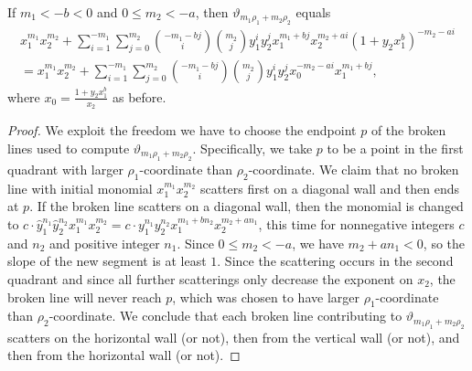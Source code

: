 \documentclass[ALCO,ThmDefs,Unicode,epreuves]{cedram}
\newcommand{\thet}{\vartheta}
\newcommand{\hy}{\hat{y}}
\begin{document}
\begin{prop}\label{theta m2 a}
If $m_1<-b<0$ and $0\le m_2<-a$, then $\thet_{m_1\rho_1+m_2\rho_2}$ equals
\begin{multline*}
x_1^{m_1}x_2^{m_2}+\sum_{i=1}^{-m_1}\sum_{j=0}^{m_2}\binom{-m_1-bj}i\binom{m_2}j y_1^iy_2^jx_1^{m_1+bj}x_2^{m_2+ai}(1+y_2x_1^b)^{-m_2-ai}\\
=x_1^{m_1}x_2^{m_2}+\sum_{i=1}^{-m_1}\sum_{j=0}^{m_2}\binom{-m_1-bj}i\binom{m_2}j y_1^iy_2^jx_0^{-m_2-ai}x_1^{m_1+bj},
\end{multline*}
where $x_0=\frac{1+y_2x_1^b}{x_2}$ as before.
\end{prop}
\begin{proof}
We exploit the freedom we have to choose the endpoint $p$ of the broken lines used to compute $\thet_{m_1\rho_1+m_2\rho_2}$.
Specifically, we take $p$ to be a point in the first quadrant with larger $\rho_1$-coordinate than $\rho_2$-coordinate.
We claim that no broken line with initial monomial $x_1^{m_1}x_2^{m_2}$ scatters first on a diagonal wall and then ends at $p$.
If the broken line scatters on a diagonal wall, then the monomial is changed to $c\cdot \hy_1^{n_1}\hy_2^{n_2}x_1^{m_1}x_2^{m_2}=c\cdot y_1^{n_1}y_2^{n_2}x_1^{m_1+bn_2}x_2^{m_2+an_1}$, this time for nonnegative integers $c$ and $n_2$ and positive integer $n_1$.
Since $0\le m_2<-a$, we have $m_2+an_1<0$, so the slope of the new segment is at least $1$.
Since the scattering occurs in the second quadrant and since all further scatterings only decrease the exponent on $x_2$, the broken line will never reach $p$, which was chosen to have larger $\rho_1$-coordinate than $\rho_2$-coordinate.
We conclude that each broken line contributing to $\thet_{m_1\rho_1+m_2\rho_2}$ scatters on the horizontal wall (or not), then from the vertical wall (or not), and then from the horizontal wall (or not).


\end{proof}
\end{document}
